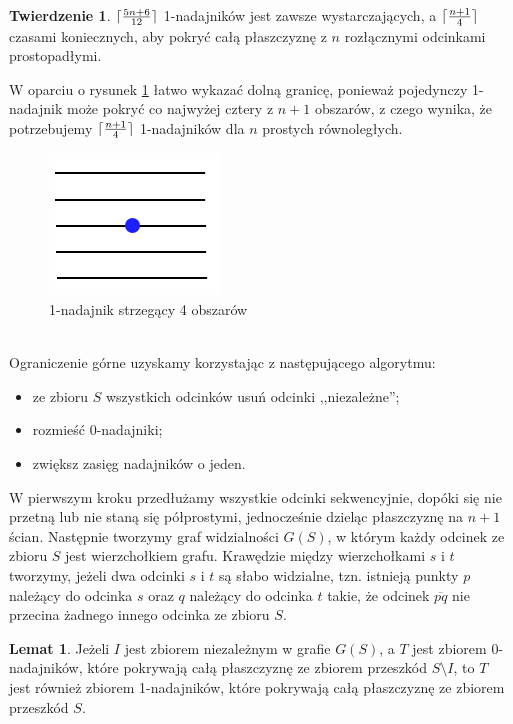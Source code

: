 \documentclass[brudnopis]{xmgr}
\DeclarePairedDelimiter\ceil{\lceil}{\rceil}
\theoremstyle{definition}
\newtheorem{Twierdzenie}{Twierdzenie}
\newtheorem{Lemat}{Lemat}
\begin{document}
\begin{Twierdzenie} \label{ograniczenie zbiór odcinków prostopadłych} \cite{knadajniki}
  $\ceil{\frac{5n+6}{12}}$ 1-nadajników jest zawsze wystarczających, a $\ceil{\frac{n+1}{4}}$ czasami koniecznych, aby pokryć całą płaszczyznę z $n$ rozłącznymi odcinkami prostopadłymi.
\end{Twierdzenie}
\indent W oparciu o rysunek \ref{fig:ogr_dolne} łatwo wykazać dolną granicę, ponieważ pojedynczy 1-nadajnik może pokryć co najwyżej cztery z $n + 1$ obszarów, z czego wynika, że potrzebujemy $\ceil{\frac{n+1}{4}}$ 1-nadajników dla $n$ prostych równoległych.
\begin{figure}[ht!]
  \centering
  \includegraphics{rysunki/k_nadajniki_ogr_dolne.png}
  \caption{1-nadajnik strzegący 4 obszarów}
  \label{fig:ogr_dolne}
\end{figure} 
\\\indent Ograniczenie górne uzyskamy korzystając z następującego algorytmu:
\begin{itemize}
  \item ze zbioru $S$ wszystkich odcinków usuń odcinki ,,niezależne'';
  \item rozmieść 0-nadajniki;
  \item zwiększ zasięg nadajników o jeden.
\end{itemize}

W pierwszym kroku przedłużamy wszystkie odcinki sekwencyjnie, dopóki się nie przetną lub nie staną się półprostymi, jednocześnie dzieląc płaszczyznę na $n + 1$ ścian. Następnie tworzymy graf widzialności $G(S)$, w którym każdy odcinek ze zbioru $S$ jest wierzchołkiem grafu. Krawędzie między wierzchołkami $s$ i $t$ tworzymy, jeżeli dwa odcinki $s$ i $t$ są słabo widzialne, tzn. istnieją punkty $p$ należący do odcinka $s$ oraz $q$ należący do odcinka $t$ takie, że odcinek $\overline{pq}$ nie przecina żadnego innego odcinka ze zbioru $S$.

\begin{Lemat}\label{0-1-nadajniki} \cite{knadajniki}
  Jeżeli $I$ jest zbiorem niezależnym w grafie $G(S)$, a $T$ jest zbiorem $0$-nadajników, które pokrywają całą płaszczyznę ze zbiorem przeszkód $S \setminus I$, to $T$ jest również zbiorem 1-nadajników, które pokrywają całą płaszczyznę ze zbiorem przeszkód $S$.
\end{Lemat}
\end{document}
